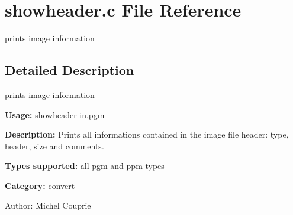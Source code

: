 \section{showheader.c File Reference}
\label{showheader_8c}
prints image information 



\subsection{Detailed Description}
prints image information 

{\bf Usage:} showheader in.pgm

{\bf Description:} Prints all informations contained in the image file header: type, header, size and comments.

{\bf Types supported:} all pgm and ppm types

{\bf Category:} convert

\begin{Desc}
\item[Author:]Michel Couprie \end{Desc}
